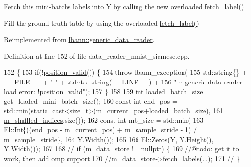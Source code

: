 Fetch this mini-\/batch\textquotesingle{}s labels into Y by calling the new overloaded \hyperlink{classlbann_1_1data__reader__mnist__siamese_a0f4171af4c56100c1c78cb53e938222c}{fetch\+\_\+label()} 

Fill the ground truth table by using the overloaded \hyperlink{classlbann_1_1data__reader__mnist__siamese_a0f4171af4c56100c1c78cb53e938222c}{fetch\+\_\+label()} 

Reimplemented from \hyperlink{classlbann_1_1generic__data__reader_a7e624f92e38b0ee4224a6afaaf2acbdb}{lbann\+::generic\+\_\+data\+\_\+reader}.



Definition at line 152 of file data\+\_\+reader\+\_\+mnist\+\_\+siamese.\+cpp.


\begin{DoxyCode}
152                                                   \{
153   \textcolor{keywordflow}{if}(!\hyperlink{classlbann_1_1generic__data__reader_a2b10538440d784f0f12582a5407acef2}{position\_valid}()) \{
154     \textcolor{keywordflow}{throw} lbann\_exception(
155       std::string\{\} + \_\_FILE\_\_ + \textcolor{stringliteral}{" "} + std::to\_string(\_\_LINE\_\_) +
156       \textcolor{stringliteral}{" :: generic data reader load error: !position\_valid"});
157   \}
158 
159   \textcolor{keywordtype}{int} loaded\_batch\_size = \hyperlink{classlbann_1_1generic__data__reader_a850e99110dd1e9df2985f09ea196fea8}{get\_loaded\_mini\_batch\_size}();
160   \textcolor{keyword}{const} \textcolor{keywordtype}{int} end\_pos = std::min(static\_cast<size\_t>(\hyperlink{classlbann_1_1generic__data__reader_a2facf4e410099ac8c1fa586e797ec2e0}{m\_current\_pos}+loaded\_batch\_size),
161                                \hyperlink{classlbann_1_1generic__data__reader_aaab6aeff67ffff1c689336851fec2c57}{m\_shuffled\_indices}.size());
162   \textcolor{keyword}{const} \textcolor{keywordtype}{int} mb\_size = std::min(
163     El::Int\{((end\_pos - \hyperlink{classlbann_1_1generic__data__reader_a2facf4e410099ac8c1fa586e797ec2e0}{m\_current\_pos}) + \hyperlink{classlbann_1_1generic__data__reader_a58461c39de7e17eafc5b98aec99cbb9b}{m\_sample\_stride} - 1) / 
      \hyperlink{classlbann_1_1generic__data__reader_a58461c39de7e17eafc5b98aec99cbb9b}{m\_sample\_stride}\},
164     Y.Width());
165 
166   El::Zeros(Y, Y.Height(), Y.Width());
167 
168 \textcolor{comment}{//  if (m\_data\_store != nullptr) \{}
169     \textcolor{comment}{//@todo: get it to work, then add omp support}
170     \textcolor{comment}{//m\_data\_store->fetch\_labels(...);}
171  \textcolor{comment}{// \}}

\end{DoxyCode}
